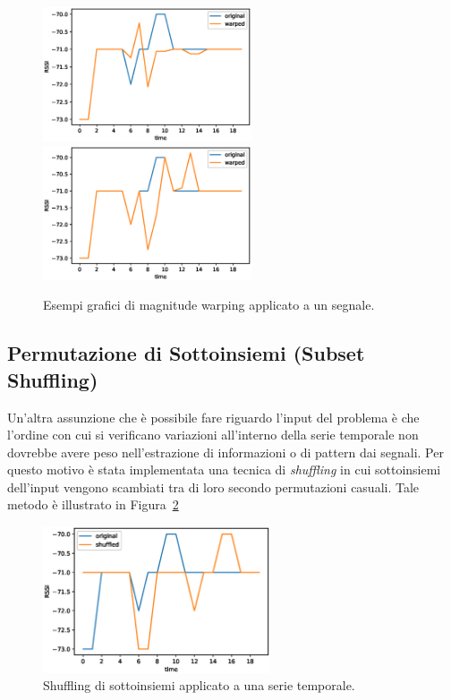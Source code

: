 \begin{figure}[H]
  \centering
  \includegraphics[width=0.55\textwidth]{./img/warping.eps}
  \includegraphics[width=0.55\textwidth]{./img/warping2.eps}
  \caption{Esempi grafici di magnitude warping applicato a un segnale.}%
  \label{fig:warping}%
\end{figure}

\subsection{Permutazione di Sottoinsiemi (Subset Shuffling)}
Un'altra assunzione che è possibile fare riguardo l'input del problema è che
l'ordine con cui si verificano variazioni all'interno della serie temporale non
dovrebbe avere peso nell'estrazione di informazioni o di pattern dai segnali.
Per questo motivo è stata implementata una tecnica di \emph{shuffling} in cui
sottoinsiemi dell'input vengono scambiati tra di loro secondo permutazioni
casuali. Tale metodo è illustrato in Figura~\ref{fig:shuffling}
\begin{figure}[htp]
  \centering
  \includegraphics[width=0.60\textwidth]{./img/shuffling.eps}
  \caption{Shuffling di sottoinsiemi applicato a una serie temporale.}%
  \label{fig:shuffling}%
\end{figure}
